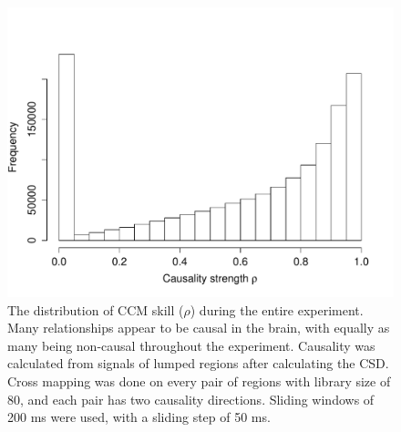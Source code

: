 \documentclass[journal,12pt,onecolumn,draftclsnofoot]{IEEEtran}  %
\begin{document}
\begin{figure}[!h]
	\centering
	\includegraphics[width=0.95\linewidth]{figures/rho_hist_all_experiment.pdf}
	\caption{The distribution of CCM skill ($\rho$) during the entire experiment. Many relationships appear to be causal in the brain, with equally as many being non-causal throughout the experiment. Causality was calculated from signals of lumped regions after calculating the CSD. Cross mapping was done on every pair of regions with library size of 80, and each pair has two causality directions. Sliding windows of 200 ms were used, with a sliding step of 50 ms.}
	\label{fig:rho_hist_all_experiment}
\end{figure}
\end{document}
